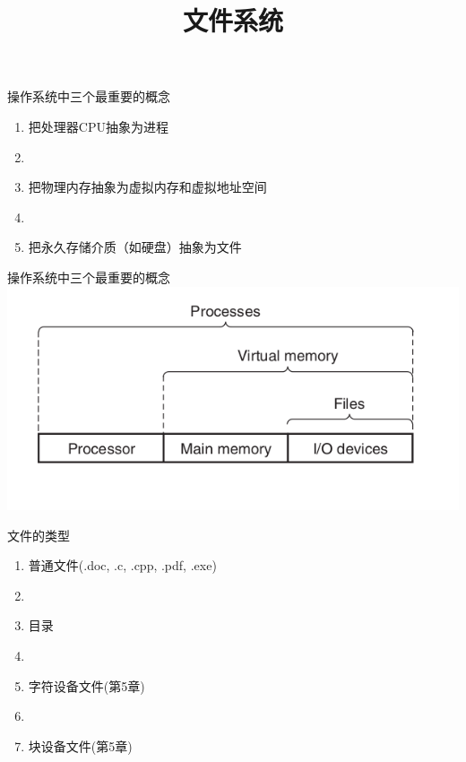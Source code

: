 \documentclass[xcolor=svgnames]{beamer}
\begin{document}
\begin{CJK*}{UTF8}{gbsn}


\title{文件系统}

\begin{frame}
\maketitle
\end{frame}


\begin{frame}{操作系统中三个最重要的概念}
\begin{enumerate}
\item 把处理器CPU抽象为\alert{进程}
\item[]
\item 把物理内存抽象为虚拟内存和虚拟\alert{地址空间}
\item[]
\item 把永久存储介质（如硬盘）抽象为\alert{文件}
\end{enumerate}
\end{frame}

\begin{frame}{操作系统中三个最重要的概念}
\includegraphics[width=1.0\textwidth]{osabstractions.png}
\end{frame}

\begin{frame}{文件的类型}
\begin{enumerate}
\item 普通文件(.doc, .c, .cpp, .pdf, .exe)
\item[]
\item 目录
\item[]
\item 字符设备文件(第5章)
\item[]
\item 块设备文件(第5章)
\end{enumerate}
\end{frame}


\end{CJK*}
\end{document}
